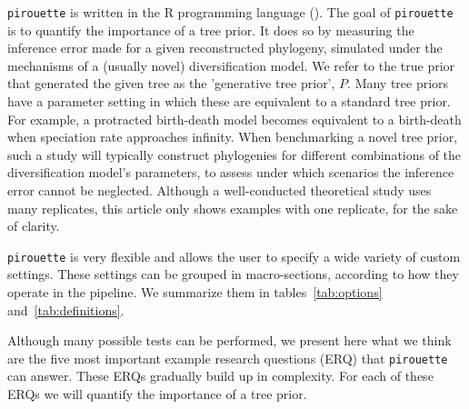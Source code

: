 \documentclass{article}
\begin{document}
\verb;pirouette; is written in the R programming language (\cite{R}).
The goal of \verb;pirouette; is to quantify the importance of a tree
prior.
It does so by measuring the inference error
made for a given reconstructed phylogeny, 
simulated under the mechanisms of a (usually novel) diversification model.
We refer to the true prior that generated the given tree
as the 'generative tree prior', $\mathit{P}$.
Many tree priors have a parameter setting in which these are equivalent
to a standard tree prior. For example, a protracted birth-death model
becomes equivalent to a birth-death when speciation rate approaches infinity.
When benchmarking a novel tree prior, 
such a study will typically construct phylogenies 
for different combinations of the diversification model's parameters, 
to assess under which scenarios the inference error cannot be neglected. 
Although a well-conducted theoretical study uses many replicates, 
this article only shows examples with one replicate, for the sake of clarity.

\verb;pirouette; is very flexible and allows the user 
to specify a wide variety of custom settings. 
These settings can be grouped in macro-sections, 
according to how they operate in the pipeline. 
We summarize them in tables~\ref{tab:options} and~\ref{tab:definitions}.

Although many possible tests can be performed, 
we present here what we think are the five most important 
example research questions (ERQ) that \verb;pirouette; can answer. 
These ERQs gradually build up in complexity.
For each of these ERQs we will quantify the importance of a tree prior.
\end{document}
